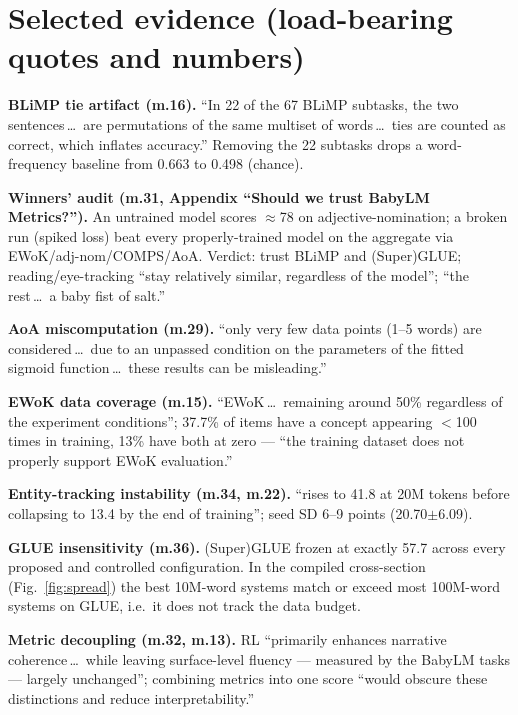\documentclass[11pt]{article}
\begin{document}
\section{Selected evidence (load-bearing quotes and numbers)}
\label{app:evidence}
{\small
\textbf{BLiMP tie artifact (m.16).} ``In 22 of the 67 BLiMP subtasks, the two sentences\,\dots\ are
permutations of the same multiset of words\,\dots\ ties are counted as correct, which inflates accuracy.''
Removing the 22 subtasks drops a word-frequency baseline from 0.663 to 0.498 (chance).

\textbf{Winners' audit (m.31, Appendix ``Should we trust BabyLM Metrics?'').} An untrained model scores
$\approx$78 on adjective-nomination; a broken run (spiked loss) beat every properly-trained model on the
aggregate via EWoK/adj-nom/COMPS/AoA. Verdict: trust BLiMP and (Super)GLUE; reading/eye-tracking ``stay
relatively similar, regardless of the model''; ``the rest\,\dots\ a baby fist of salt.''

\textbf{AoA miscomputation (m.29).} ``only very few data points (1--5 words) are considered\,\dots\ due to an
unpassed condition on the parameters of the fitted sigmoid function\,\dots\ these results can be misleading.''

\textbf{EWoK data coverage (m.15).} ``EWoK\,\dots\ remaining around 50\% regardless of the experiment
conditions''; 37.7\% of items have a concept appearing $<$100 times in training, 13\% have both at zero ---
``the training dataset does not properly support EWoK evaluation.''

\textbf{Entity-tracking instability (m.34, m.22).} ``rises to 41.8 at 20M tokens before collapsing to 13.4 by
the end of training''; seed SD 6--9 points (20.70$\pm$6.09).

\textbf{GLUE insensitivity (m.36).} (Super)GLUE frozen at exactly 57.7 across every proposed and controlled
configuration. In the compiled cross-section (Fig.~\ref{fig:spread}) the best 10M-word systems match or
exceed most 100M-word systems on GLUE, i.e.\ it does not track the data budget.

\textbf{Metric decoupling (m.32, m.13).} RL ``primarily enhances narrative coherence\,\dots\ while leaving
surface-level fluency --- measured by the BabyLM tasks --- largely unchanged''; combining metrics into one
score ``would obscure these distinctions and reduce interpretability.''
\par}
\end{document}
